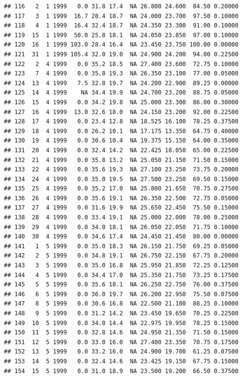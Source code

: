\documentclass[
]{book}
\begin{document}
\begin{verbatim}
## 116   2  1 1999   0.0 31.8 17.4  NA 26.800 24.600  84.50 0.20000
## 117   3  1 1999  16.7 28.4 18.7  NA 24.000 23.700  97.50 0.10000
## 118   4  1 1999  16.4 32.4 18.7  NA 24.350 23.300  91.00 0.10000
## 119  15  1 1999  50.0 25.8 18.1  NA 24.050 23.850  97.00 0.10000
## 120  16  1 1999 103.0 28.4 16.4  NA 23.450 23.750 100.00 0.00000
## 121  31  1 1999 105.4 32.0 19.0  NA 24.900 24.200  94.00 0.22500
## 122   2  4 1999   0.0 35.2 18.5  NA 27.400 23.600  72.75 0.10000
## 123   7  4 1999   0.0 35.8 19.3  NA 26.350 23.100  77.00 0.05000
## 124  13  4 1999   7.5 32.8 19.7  NA 24.200 22.900  89.25 0.00000
## 125  14  4 1999    NA 34.4 19.9  NA 24.700 23.200  88.75 0.05000
## 126  15  4 1999   0.0 34.2 19.8  NA 25.000 23.300  86.00 0.30000
## 127  16  4 1999  13.0 32.6 18.0  NA 24.150 23.200  92.00 0.22500
## 128  17  4 1999   0.0 23.4 12.8  NA 18.525 16.100  78.25 0.37500
## 129  18  4 1999   0.0 26.2 10.1  NA 17.175 13.350  64.75 0.40000
## 130  19  4 1999   0.0 30.6 10.4  NA 19.375 15.150  64.00 0.35000
## 131  20  4 1999   0.0 32.4 14.2  NA 22.425 18.050  65.00 0.22500
## 132  21  4 1999   0.0 35.8 13.2  NA 25.050 21.150  71.50 0.15000
## 133  22  4 1999   0.0 35.6 19.3  NA 27.100 23.250  73.75 0.20000
## 134  24  4 1999   0.0 35.0 19.5  NA 27.500 23.250  69.50 0.15000
## 135  25  4 1999   0.0 35.2 17.0  NA 25.800 21.650  70.75 0.27500
## 136  26  4 1999   0.0 35.6 19.1  NA 26.350 22.500  72.75 0.05000
## 137  27  4 1999   0.0 31.6 19.9  NA 25.650 22.450  75.50 0.15000
## 138  28  4 1999   0.0 33.4 19.1  NA 25.000 22.000  78.00 0.25000
## 139  29  4 1999   0.0 34.0 18.1  NA 26.050 22.050  71.75 0.10000
## 140  30  4 1999   0.0 34.6 17.4  NA 24.450 21.450  80.00 0.00000
## 141   1  5 1999   0.0 35.0 18.3  NA 26.150 21.750  69.25 0.05000
## 142   2  5 1999   0.0 34.8 19.1  NA 26.750 22.150  67.75 0.20000
## 143   3  5 1999   0.0 35.0 16.8  NA 25.950 21.850  72.25 0.12500
## 144   4  5 1999   0.0 34.4 17.0  NA 25.350 21.750  73.25 0.17500
## 145   5  5 1999   0.0 35.6 18.1  NA 26.250 22.750  76.00 0.37500
## 146   6  5 1999   0.0 36.0 19.7  NA 26.200 22.950  75.50 0.07500
## 147   8  5 1999   0.0 30.6 16.8  NA 22.500 21.100  88.25 0.10000
## 148   9  5 1999   0.0 31.2 14.2  NA 23.450 19.650  70.25 0.22500
## 149  10  5 1999   0.0 34.0 14.4  NA 22.975 19.950  78.25 0.15000
## 150  11  5 1999   0.0 32.8 14.6  NA 24.950 21.350  71.50 0.15000
## 151  12  5 1999   0.0 33.0 16.0  NA 27.400 23.350  70.75 0.17500
## 152  13  5 1999   0.0 33.2 16.0  NA 24.900 19.700  61.25 0.07500
## 153  14  5 1999   0.0 32.4 14.6  NA 23.425 19.150  67.75 0.15000
## 154  15  5 1999   0.0 31.0 18.9  NA 23.500 19.200  66.50 0.37500

\end{verbatim}
\end{document}
